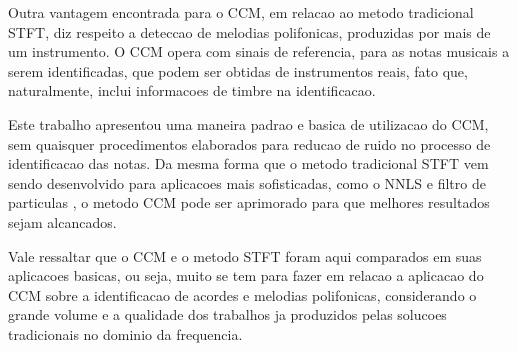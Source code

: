\documentclass{article}
\begin{document}
	Outra vantagem encontrada para o CCM, em relacao ao metodo tradicional STFT, diz respeito a deteccao de melodias polifonicas, produzidas por mais de um instrumento. O CCM opera com sinais de referencia, para as notas musicais a serem identificadas, que podem ser obtidas de instrumentos reais, fato que, naturalmente, inclui informacoes de timbre na identificacao.

	Este trabalho apresentou uma maneira padrao e basica de utilizacao do CCM, sem quaisquer procedimentos elaborados para reducao de ruido no processo de identificacao das notas. Da mesma forma que o metodo tradicional STFT vem sendo desenvolvido para aplicacoes mais sofisticadas, como o NNLS \cite{mauch2010approximate} e filtro de particulas \cite{jo2010melody}, o metodo CCM pode ser aprimorado para que melhores resultados sejam alcancados.
	
	Vale ressaltar que o CCM e o metodo STFT foram aqui comparados em suas aplicacoes basicas, ou seja, muito se tem para fazer em relacao a aplicacao do CCM sobre a identificacao de acordes e melodias polifonicas, considerando o grande volume e a qualidade dos trabalhos ja produzidos pelas solucoes tradicionais no dominio da frequencia.	




%
%
%
%
\end{document}

